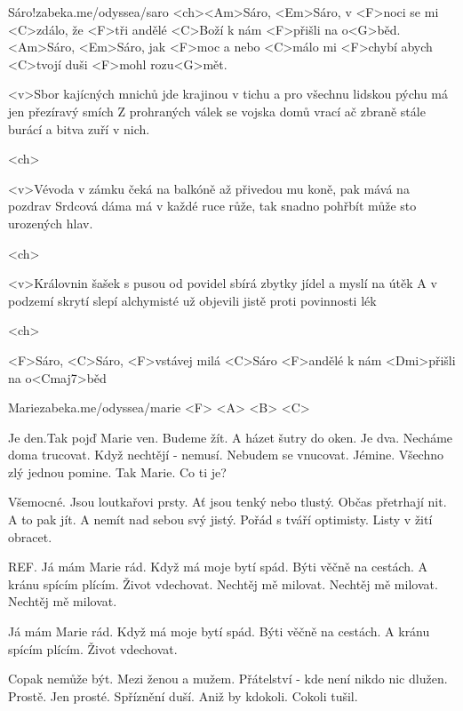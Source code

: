 


\songtitlepage

\begin{song}[Traband]{1}{Sáro!}{zabeka.me/odyssea/saro}
<ch><Am>Sáro, <Em>Sáro, v <F>noci se mi <C>zdálo,
že <F>tři andělé <C>Boží k nám <F>přišli na o<G>běd.
<Am>Sáro, <Em>Sáro, jak <F>moc a nebo <C>málo
mi <F>chybí abych <C>tvojí duši <F>mohl rozu<G>mět.

<v>Sbor kajícných mnichů jde krajinou v tichu 
a pro všechnu lidskou pýchu má jen přezíravý smích 
Z prohraných válek se vojska domů vrací 
ač zbraně stále burácí a bitva zuří v nich.

<ch>

<v>Vévoda v zámku čeká na balkóně 
až přivedou mu koně, pak mává na pozdrav 
Srdcová dáma má v každé ruce růže, 
tak snadno pohřbít může sto urozených hlav.

<ch>

<v>Královnin šašek s pusou od povidel 
sbírá zbytky jídel a myslí na útěk 
A v podzemí skrytí slepí alchymisté 
už objevili jistě proti povinnosti lék

<ch>

<F>Sáro, <C>Sáro, <F>vstávej milá <C>Sáro 
<F>andělé k nám <Dmi>přišli na o<Cmaj7>běd


\end{song}
\begin{song}[]{2}{Marie}{zabeka.me/odyssea/marie}
<F> <A> <B> <C>

Je den.Tak pojď Marie ven.
Budeme žít. A házet šutry do oken.
Je dva. Necháme doma trucovat.
Když nechtějí - nemusí. Nebudem se vnucovat. 
Jémine. Všechno zlý jednou pomine.
Tak Marie. Co ti je?

Všemocné. Jsou loutkařovi prsty.
Ať jsou tenký nebo tlustý. Občas přetrhají nit.
A to pak jít. A nemít nad sebou svý jistý.
Pořád s tváří optimisty. Listy v žití obracet.

REF.
Já mám Marie rád. Když má moje bytí spád.
Býti věčně na cestách. A kránu spícím plícím.
Život vdechovat. Nechtěj mě milovat.
Nechtěj mě milovat. Nechtěj mě milovat.

Já mám Marie rád. Když má moje bytí spád.
Býti věčně na cestách. A kránu spícím plícím.
Život vdechovat.

Copak nemůže být. Mezi ženou a mužem.
Přátelství - kde není nikdo nic dlužen. Prostě.
Jen prosté. Spříznění duší.
Aniž by kdokoli. Cokoli tušil.

\end{song}
